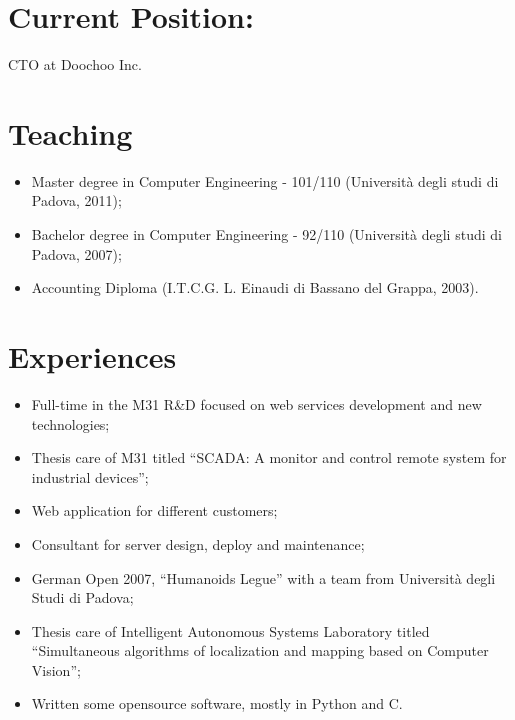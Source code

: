 \documentclass[pdftex, a4paper, 11pt]{article}
\begin{document}
\section*{Current Position:}

CTO at Doochoo Inc.




\section*{Teaching}
\begin{itemize}
\item Master degree in Computer Engineering - 101/110 (Universit\`a degli studi di Padova, 2011);
\item Bachelor degree in Computer Engineering - 92/110 (Universit\`a degli studi di Padova, 2007);
\item Accounting Diploma (I.T.C.G. L. Einaudi di Bassano del Grappa, 2003).
\end{itemize}

\section*{Experiences}
\begin{itemize}
\item Full-time in the M31 R\&D focused on web services development and new technologies;
\item Thesis care of M31 titled ``SCADA: A monitor and control remote system for industrial devices'';
\item Web application for different customers;
\item Consultant for server design, deploy and maintenance;
\item German Open 2007, ``Humanoids Legue'' with a team from Universit\`a
degli Studi di Padova;
\item Thesis care of Intelligent Autonomous Systems Laboratory titled ``Simultaneous
algorithms of localization and mapping based on Computer Vision'';
\item Written some opensource software, mostly in Python and C.
\end{itemize}
\end{document}
